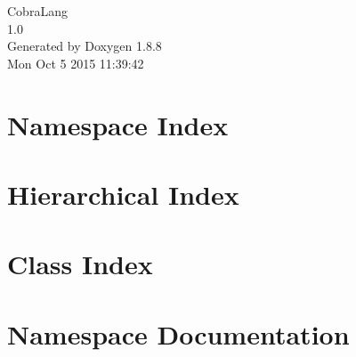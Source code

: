 \documentclass[twoside]{book}
\newcommand{\+}{\discretionary{\mbox{\scriptsize$\hookleftarrow$}}{}{}}
\newcommand{\clearemptydoublepage}{%
  \newpage{\pagestyle{empty}\cleardoublepage}%
}
\begin{document}
\hypersetup{pageanchor=false,
             bookmarks=true,
             bookmarksnumbered=true,
             pdfencoding=unicode
            }
\begin{titlepage}
\vspace*{7cm}
\begin{center}%
{\Large Cobra\+Lang \\[1ex]\large 1.\+0 }\\
\vspace*{1cm}
{\large Generated by Doxygen 1.8.8}\\
\vspace*{0.5cm}
{\small Mon Oct 5 2015 11:39:42}\\
\end{center}
\end{titlepage}
\clearemptydoublepage
\tableofcontents
\clearemptydoublepage
{}
\hypersetup{pageanchor=true}

\chapter{Namespace Index}

\chapter{Hierarchical Index}

\chapter{Class Index}

\chapter{Namespace Documentation}

\end{document}
